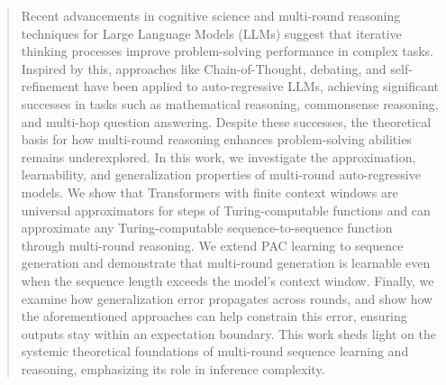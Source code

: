 \begin{abstract}
 Recent advancements in cognitive science and multi-round reasoning techniques for Large Language Models (LLMs) suggest that iterative thinking processes improve problem-solving performance in complex tasks. Inspired by this, approaches like Chain-of-Thought, debating, and self-refinement have been applied to auto-regressive LLMs, achieving significant successes in tasks such as mathematical reasoning, commonsense reasoning, and multi-hop question answering. Despite these successes, the theoretical basis for how multi-round reasoning enhances problem-solving abilities remains underexplored.
In this work, we investigate the approximation, learnability, and generalization properties of multi-round auto-regressive models. We show that Transformers with finite context windows are universal approximators for steps of Turing-computable functions and can approximate any Turing-computable sequence-to-sequence function through multi-round reasoning. We extend PAC learning to sequence generation and demonstrate that multi-round generation is learnable even when the sequence length exceeds the model's context window. 
Finally, we examine how generalization error propagates across rounds, and show how the aforementioned approaches can help constrain this error, ensuring outputs stay within an expectation boundary. This work sheds light on the systemic theoretical foundations of multi-round sequence learning and reasoning, emphasizing its role in inference complexity.
\end{abstract}